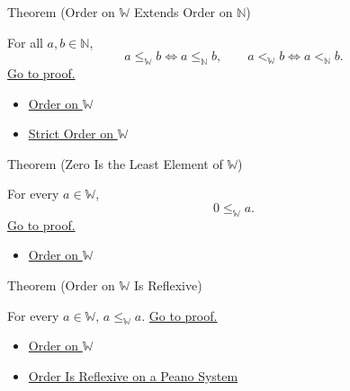 \begin{theorembox}{Theorem (Order on \texorpdfstring{$\mathbb{W}$}{W} Extends Order on \texorpdfstring{$\mathbb{N}$}{N})}
\begin{theorem}
\label{thm:order-on-w-extends-order-on-n}
For all $a,b\in\mathbb{N}$,
\[
a\leq_{\mathbb{W}}b\Longleftrightarrow a\leq_{\mathbb{N}}b,
\qquad
a<_{\mathbb{W}}b\Longleftrightarrow a<_{\mathbb{N}}b.
\]
\hyperref[prf:order-on-w-extends-order-on-n]{Go to proof.}
\end{theorem}
\end{theorembox}

\begin{dependencies}
\begin{itemize}
  \item \hyperref[def:order-on-w]{Order on $\mathbb{W}$}
  \item \hyperref[def:strict-order-on-w]{Strict Order on $\mathbb{W}$}
\end{itemize}
\end{dependencies}

\begin{theorembox}{Theorem (Zero Is the Least Element of \texorpdfstring{$\mathbb{W}$}{W})}
\begin{theorem}
\label{thm:zero-least-element-of-w}
For every $a\in\mathbb{W}$,
\[
0\leq_{\mathbb{W}}a.
\]
\hyperref[prf:zero-least-element-of-w]{Go to proof.}
\end{theorem}
\end{theorembox}

\begin{dependencies}
\begin{itemize}
  \item \hyperref[def:order-on-w]{Order on $\mathbb{W}$}
\end{itemize}
\end{dependencies}

\begin{theorembox}{Theorem (Order on \texorpdfstring{$\mathbb{W}$}{W} Is Reflexive)}
\begin{theorem}
\label{thm:order-on-w-reflexive}
For every $a\in\mathbb{W}$, $a\leq_{\mathbb{W}}a$.
\hyperref[prf:order-on-w-reflexive]{Go to proof.}
\end{theorem}
\end{theorembox}

\begin{dependencies}
\begin{itemize}
  \item \hyperref[def:order-on-w]{Order on $\mathbb{W}$}
  \item \hyperref[thm:order-reflexive-on-peano-system]{Order Is Reflexive on a Peano System}
\end{itemize}
\end{dependencies}

